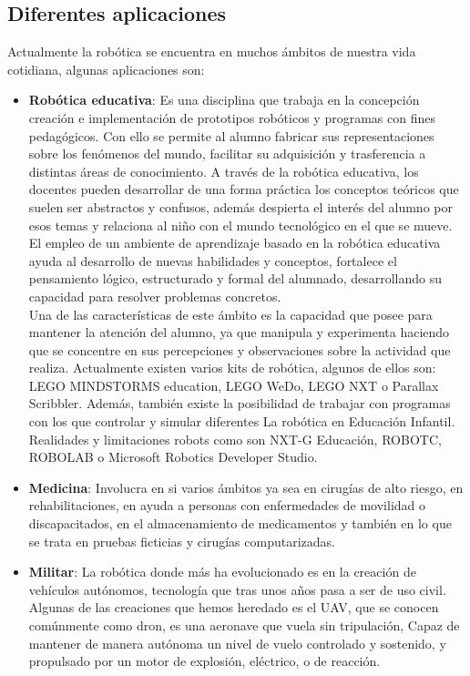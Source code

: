 \subsection{Diferentes aplicaciones}
\label{subsec:diferentes aplicaciones}
Actualmente la robótica se encuentra en muchos ámbitos de nuestra vida cotidiana, algunas aplicaciones son:
\begin{itemize}
\item \textbf{Robótica educativa}: Es una disciplina que trabaja en la concepción creación e implementación de prototipos robóticos y programas con fines pedagógicos. Con ello se permite al alumno fabricar sus representaciones sobre los fenómenos del mundo, facilitar su adquisición y trasferencia a distintas áreas de conocimiento.
A través de la robótica educativa, los docentes pueden desarrollar de una forma práctica los conceptos teóricos que suelen ser abstractos y confusos, además despierta el interés del alumno por esos temas y relaciona al niño con el mundo tecnológico en el que se mueve. El empleo de un ambiente de aprendizaje basado en la robótica educativa ayuda al desarrollo de nuevas habilidades y conceptos, fortalece el pensamiento lógico, estructurado y formal del alumnado, desarrollando su capacidad para resolver problemas concretos.\\

Una de las características de este ámbito es la capacidad que posee para mantener la
atención del alumno, ya que manipula y experimenta haciendo que se concentre en sus
percepciones y observaciones sobre la actividad que realiza. Actualmente existen varios kits de robótica, algunos de ellos son: LEGO MINDSTORMS education, LEGO WeDo, LEGO NXT o Parallax Scribbler. Además, también existe la posibilidad de trabajar con programas con los que controlar y simular diferentes La robótica en Educación Infantil. Realidades y limitaciones robots como son NXT-G Educación, ROBOTC, ROBOLAB o Microsoft Robotics Developer Studio.

\item \textbf{Medicina}: Involucra en si varios ámbitos ya sea en cirugías de alto riesgo, en rehabilitaciones, en ayuda a personas con enfermedades de movilidad o discapacitados, en el almacenamiento de medicamentos y también en lo que se trata en pruebas ficticias y cirugías computarizadas.

\item \textbf{Militar}: La robótica donde más ha evolucionado es en la creación de vehículos autónomos, tecnología que tras unos años pasa a ser de uso civil.
Algunas de las creaciones que hemos heredado es el UAV, que se conocen comúnmente como dron, es una aeronave que vuela sin tripulación, Capaz de mantener de manera autónoma un nivel de vuelo controlado y sostenido, y propulsado por un motor de explosión, eléctrico, o de reacción.


\end{itemize}
